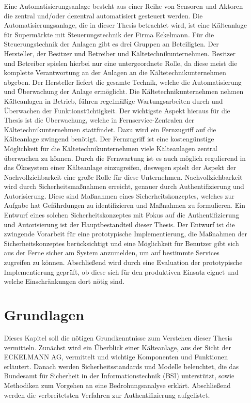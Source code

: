 \documentclass[11pt,a4paper]{report}
\begin{document}
Eine Automatisierungsanlage besteht aus einer Reihe von Sensoren und Aktoren die zentral und/oder dezentral automatisiert gesteuert werden. Die Automatisierungsanlage, die in dieser Thesis betrachtet wird, ist eine Kälteanlage für Supermärkte mit Steuerungstechnik der Firma Eckelmann. Für die Steuerungstechnik der Anlagen gibt es drei Gruppen an Beteiligten. Der Hersteller, der Besitzer und Betreiber und Kältetechnikunternehmen. Besitzer und Betreiber spielen hierbei nur eine untergeordnete Rolle, da diese meist die komplette Verantwortung an der Anlagen an die Kältetechnikunternehmen abgeben. Der Hersteller liefert die gesamte Technik, welche die Automatisierung und Überwachung der Anlage ermöglicht. Die Kältetechnikunternehmen nehmen Kälteanlagen in Betrieb, führen regelmäßige Wartungsarbeiten durch und Überwachen der Funktionstüchtigkeit. Der wichtigste Aspekt hieraus für die Thesis ist die Überwachung, welche in Fernservice-Zentralen der Kältetechnikunternehmen stattfindet. Dazu wird ein Fernzugriff auf die Kälteanlage zwingend benötigt. Der Fernzugriff ist eine kostengünstige Möglichkeit für die Kältetechnikunternehmen viele Kälteanlagen zentral überwachen zu können. Durch die Fernwartung ist es auch möglich regulierend in das Ökosystem einer Kälteanlage einzugreifen, deswegen spielt der Aspekt der Nachvollziehbarkeit eine große Rolle für diese Unternehmen. Nachvollziehbarkeit wird durch Sicherheitsmaßnahmen erreicht, genauer durch Authentifizierung und Autorisierung. Diese sind Maßnahmen eines Sicherheitskonzeptes, welches zur Aufgabe hat Gefährdungen zu identifizieren und Maßnahmen zu formulieren. Ein Entwurf eines solchen Sicherheitskonzeptes mit Fokus auf die Authentifizierung und Autorisierung ist der Hauptbestandteil dieser Thesis. Der Entwurf ist die zwingende Vorarbeit für eine prototypische Implementierung, die Maßnahmen der Sicherheitskonzeptes berücksichtigt und eine Möglichkeit für Benutzer gibt sich aus der Ferne sicher am System anzumelden, um auf bestimmte Services zugreifen zu können. Abschließend wird durch eine Evaluation der prototypische Implementierung geprüft, ob diese sich für den produktiven Einsatz eignet und welche Einschränkungen dort nötig sind.


\chapter{Grundlagen} \label{chap:basics}

Dieses Kapitel soll die nötigen Grundkenntnisse zum Verstehen dieser Thesis vermitteln. Zunächst wird ein Überblick einer Kälteanlage, aus der Sicht der ECKELMANN AG, vermittelt und wichtige Komponenten und Funktionen erläutert. Danach werden Sicherheitsstandards und Modelle beleuchtet, die das Bundesamt für Sicherheit in der Informationstechnik (BSI) unterstützt, sowie Methodiken zum Vorgehen an eine Bedrohungsanalyse erklärt. Abschließend werden die verbreitetsten Verfahren zur Authentifizierung aufgelistet.
\end{document}
